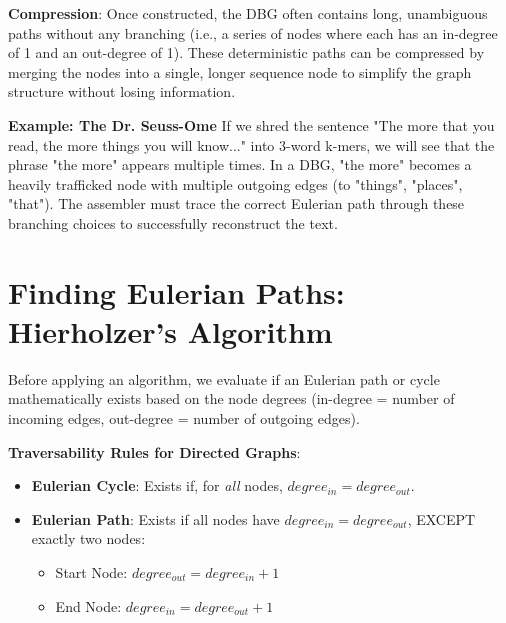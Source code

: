 \documentclass[11pt,a4paper]{article}
\newenvironment{important}{
    \vspace{1em}
    \begin{tcolorbox}[colback=blue!5!white, colframe=blue!75!black, boxrule=1pt, arc=4pt, left=10pt, right=10pt, top=10pt, bottom=10pt]
}{
    \end{tcolorbox}
    \vspace{1em}
}
\begin{document}

\textbf{Compression}: Once constructed, the DBG often contains long, unambiguous paths without any branching (i.e., a series of nodes where each has an in-degree of 1 and an out-degree of 1). These deterministic paths can be compressed by merging the nodes into a single, longer sequence node to simplify the graph structure without losing information.

\textbf{Example: The Dr. Seuss-Ome}
If we shred the sentence "The more that you read, the more things you will know..." into 3-word k-mers, we will see that the phrase "the more" appears multiple times. In a DBG, "the more" becomes a heavily trafficked node with multiple outgoing edges (to "things", "places", "that"). The assembler must trace the correct Eulerian path through these branching choices to successfully reconstruct the text.

\section{Finding Eulerian Paths: Hierholzer's Algorithm}

Before applying an algorithm, we evaluate if an Eulerian path or cycle mathematically exists based on the node degrees (in-degree = number of incoming edges, out-degree = number of outgoing edges).

\begin{important}
\textbf{Traversability Rules for Directed Graphs}:
\begin{itemize}
    \item \textbf{Eulerian Cycle}: Exists if, for \textit{all} nodes, $degree_{in} = degree_{out}$.
    \item \textbf{Eulerian Path}: Exists if all nodes have $degree_{in} = degree_{out}$, EXCEPT exactly two nodes:
    \begin{itemize}
        \item Start Node: $degree_{out} = degree_{in} + 1$
        \item End Node: $degree_{in} = degree_{out} + 1$
    \end{itemize}
\end{itemize}
\end{important}
\end{document}
